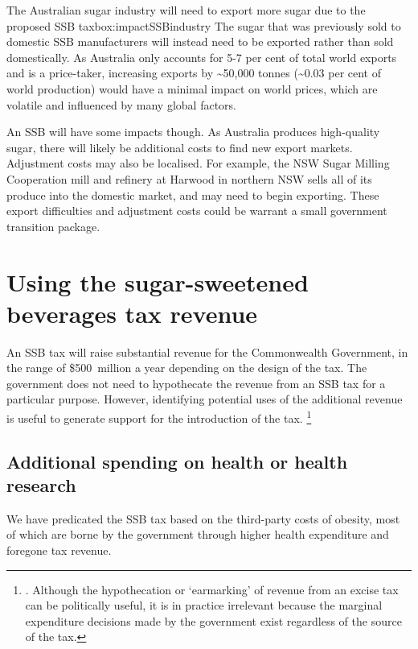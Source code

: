 \documentclass[embargoed]{grattan}
\begin{document}
\begin{bigbox*}{The Australian sugar industry will need to export more sugar due to the proposed SSB tax}{box:impactSSBindustry}
The sugar that was previously sold to domestic SSB manufacturers will instead need to be exported rather than sold domestically.
As Australia only accounts for 5-7 per cent of total world exports and is a price-taker, increasing exports by \textasciitilde{}50,000 tonnes (\textasciitilde{}0.03 per cent of world production) would have a minimal impact on world prices, which are volatile and influenced by many global factors. 

An SSB will have some impacts though.
As Australia produces high-quality sugar, there will likely be additional costs to find new export markets.
Adjustment costs may also be localised.
For example, the NSW Sugar Milling Cooperation mill and refinery at Harwood in northern NSW sells all of its produce into the domestic market, and may need to begin exporting.
These export difficulties and adjustment costs could be warrant a small government transition package.
\end{bigbox*}

\chapter{Using the sugar-sweetened beverages tax revenue }\label{using-the-sugar-sweetened-beverages-tax-revenue}

An SSB tax will raise substantial revenue for the Commonwealth Government, in the range of \$500~million a year depending on the design of the tax.
The government does not need to hypothecate the revenue from an SSB tax for a particular purpose.
However, identifying potential uses of the additional revenue is useful to generate support for the introduction of the tax.%
\footnote{\textcites{Freebairn2010Taxationobesity}{Organization2016FiscalPoliciesDiet}{CnossenExcisetaxationAustralia}.
Although the hypothecation or `earmarking' of revenue from an excise tax can be politically useful, it is in practice irrelevant because the marginal expenditure decisions made by the government exist regardless of the source of the tax.}

\section{Additional spending on health or health research}\label{additional-spending-on-health-or-health-research}

We have predicated the SSB tax based on the third-party costs of obesity, most of which are borne by the government through higher health expenditure and foregone tax revenue.
\end{document}
